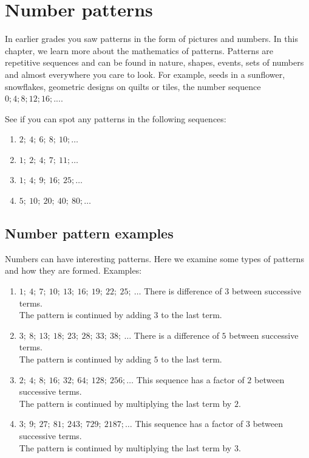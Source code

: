          \chapter{Number patterns}
    \setcounter{figure}{1}
    \setcounter{subfigure}{1}
            
In earlier grades you saw patterns in the form of pictures and numbers. In this chapter, we learn more about the mathematics of patterns. Patterns are repetitive sequences and can be found in nature, shapes, events, sets of numbers and almost everywhere you care to look. For example, seeds in a sunflower, snowflakes, geometric designs on quilts or tiles, the number sequence $0;4;8;12;16;\mathrm{...}$.\par 
See if you can spot any patterns in the following sequences: 
\begin{enumerate}[noitemsep, label=\textbf{\arabic*}. ] 
    \item $2;~4;~6;~8;~10;\ldots$
    \item $1;~2;~4;~7;~11;\ldots$
    \item $1;~4;~9;~16;~25;\ldots$
    \item $5;~10;~20;~40;~80;\ldots$
\end{enumerate}

   
\section{Number pattern examples}
Numbers can have interesting patterns. Here we examine some types of patterns and how they are formed.
Examples:
\begin{enumerate}[noitemsep, label=\textbf{\arabic*}. ] 
    \item $1;~4;~7;~10;~13;~16;~19;~22;~25;~\ldots$
    There is difference of $3$ between successive terms.\\
    The pattern is continued by adding $3$ to the last term.
    \item $3;~8;~13;~18;~23;~28;~33;~38;~\ldots$
    There is a difference of $5$ between successive terms.\\
    The pattern is continued by adding $5$ to the last term.
    \item $2;~4;~8;~16;~32;~64;~128;~256;\ldots$
    This sequence has a factor of $2$ between successive terms.\\
    The pattern is continued by multiplying the last term by $2$.
    \item $3;~9;~27;~81;~243;~729;~2187;\ldots$
    This sequence has a factor of $3$ between successive terms.\\
    The pattern is continued by multiplying the last term by $3$.
\end{enumerate}
     

